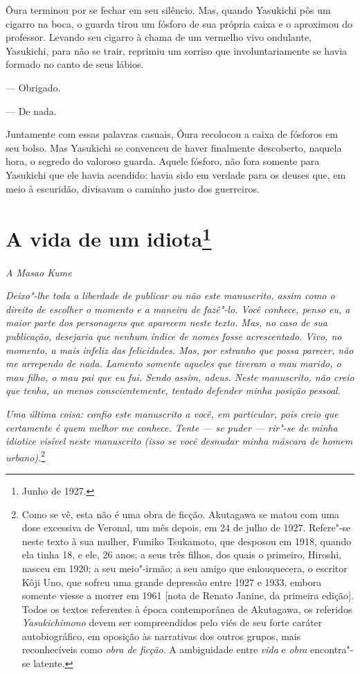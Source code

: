 Ôura terminou por se fechar em seu silêncio. Mas, quando Yasukichi pôs
um cigarro na boca, o guarda tirou um fósforo de sua própria caixa e o
aproximou do professor. Levando seu cigarro à chama de um vermelho vivo
ondulante, Yasukichi, para não se trair, reprimiu um sorriso que
involuntariamente se havia formado no canto de seus lábios.

--- Obrigado.

--- De nada.

Juntamente com essas palavras casuais, Ôura recolocou a caixa de
fósforos em seu bolso. Mas Yasukichi se convenceu de haver finalmente
descoberto, naquela hora, o segredo do valoroso guarda. Aquele fósforo,
não fora somente para Yasukichi que ele havia acendido: havia sido em
verdade para os deuses que, em meio à escuridão, divisavam o caminho
justo dos guerreiros.

\chapter{A vida de um idiota\footnote{Junho de 1927.}}

\begin{flushright}
\textit{A Masao Kume}
\end{flushright}

\noindent\textit{Deixo"-lhe toda a liberdade de publicar ou não este manuscrito, assim
como o direito de escolher o momento e a maneira de fazê"-lo. Você
conhece, penso eu, a maior parte dos personagens que aparecem neste
texto. Mas, no caso de sua publicação, desejaria que nenhum índice de
nomes fosse acrescentado. Vivo, no momento, a mais infeliz das
felicidades. Mas, por estranho que possa parecer, não me arrependo de
nada. Lamento somente aqueles que tiveram o mau marido, o mau filho, o
mau pai que eu fui. Sendo assim, adeus. Neste manuscrito, não creio que
tenha, ao menos conscientemente, tentado defender minha posição pessoal.}

\textit{Uma última coisa: confio este manuscrito a você, em particular, pois
creio que certamente é quem melhor me conhece. Tente --- se puder ---
rir"-se de minha idiotice visível neste manuscrito (isso se você
desnudar minha máscara de homem urbano).}\footnote{Como se vê, esta não é uma obra de ficção. Akutagawa se matou com uma dose excessiva de Veronal, um mês
depois, em 24 de julho de 1927. Refere"-se neste texto à sua mulher,
Fumiko Tsukamoto, que desposou em 1918, quando ela tinha 18, e ele,
26 anos; a seus três filhos, dos quais o primeiro, Hiroshi,
nasceu em 1920; a seu meio"-irmão; a seu amigo que enlouquecera, o escritor
Kôji Uno, que sofreu uma grande depressão entre 1927 e 1933, embora
somente viesse a morrer em 1961 {[}nota de Renato Janine, da primeira edição{]}.
Todos os textos referentes à época contemporânea de Akutagawa, os referidos
\textit{Yasukichimono} devem ser compreendidos pelo viés de seu forte caráter
autobiográfico, em oposição às narrativas dos outros grupos, mais
reconhecíveis como \textit{obra de ficção}. A ambiguidade entre \textit{vida} e
\textit{obra} encontra"-se latente.}

